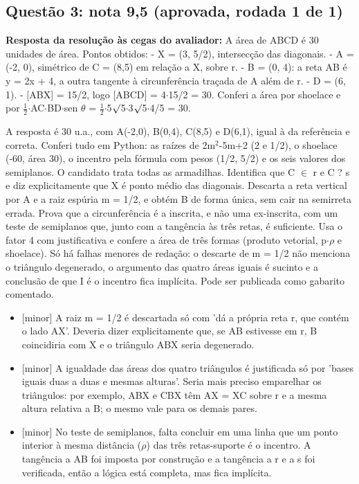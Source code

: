 \documentclass{article}%
\begin{document}
\subsection*{Questão 3: nota 9,5 (aprovada, rodada 1 de 1)}%
\textbf{Resposta da resolução às cegas do avaliador:} A área de ABCD é 30 unidades de área.\newline%
\newline%
Pontos obtidos:\newline%
{-} X = (3, 5/2), intersecção das diagonais.\newline%
{-} A = (-2, 0), simétrico de C = (8,5) em relação a X, sobre r.\newline%
{-} B = (0, 4): a reta AB é y = 2x + 4, a outra tangente à circunferência traçada de A além de r.\newline%
{-} D = (6, 1).\newline%
{-} {[}ABX{]} = 15/2, logo {[}ABCD{]} = 4$\cdot$15/2 = 30.\newline%
\newline%
Conferi a área por shoelace e por $\frac12$$\cdot$AC$\cdot$BD$\cdot$sen $\theta$ = $\frac12$$\cdot$5$\surd$5$\cdot$3$\surd$5$\cdot$4/5 = 30.\par %
A resposta é 30 u.a., com A(-2,0), B(0,4), C(8,5) e D(6,1), igual à da referência e correta. Conferi tudo em Python: as raízes de 2m$^2$-5m+2 (2 e 1/2), o shoelace (-60, área 30), o incentro pela fórmula com pesos (1/2, 5/2) e os seis valores dos semiplanos. O candidato trata todas as armadilhas. Identifica que C $\in$ r e C ? s e diz explicitamente que X é ponto médio das diagonais. Descarta a reta vertical por A e a raiz espúria m = 1/2, e obtém B de forma única, sem cair na semirreta errada. Prova que a circunferência é a inscrita, e não uma ex{-}inscrita, com um teste de semiplanos que, junto com a tangência às três retas, é suficiente. Usa o fator 4 com justificativa e confere a área de três formas (produto vetorial, p$\cdot$$\rho$ e shoelace). Só há falhas menores de redação: o descarte de m = 1/2 não menciona o triângulo degenerado, o argumento das quatro áreas iguais é sucinto e a conclusão de que I é o incentro fica implícita. Pode ser publicada como gabarito comentado.%
\begin{itemize}%
\item%
{[}minor{]} A raiz m = 1/2 é descartada só com 'dá a própria reta r, que contém o lado AX'. Deveria dizer explicitamente que, se AB estivesse em r, B coincidiria com X e o triângulo ABX seria degenerado.%
\item%
{[}minor{]} A igualdade das áreas dos quatro triângulos é justificada só por 'bases iguais duas a duas e mesmas alturas'. Seria mais preciso emparelhar os triângulos: por exemplo, ABX e CBX têm AX = XC sobre r e a mesma altura relativa a B; o mesmo vale para os demais pares.%
\item%
{[}minor{]} No teste de semiplanos, falta concluir em uma linha que um ponto interior à mesma distância ($\rho$) das três retas{-}suporte é o incentro. A tangência a AB foi imposta por construção e a tangência a r e a s foi verificada, então a lógica está completa, mas fica implícita.%
\end{itemize}%
\end{document}
